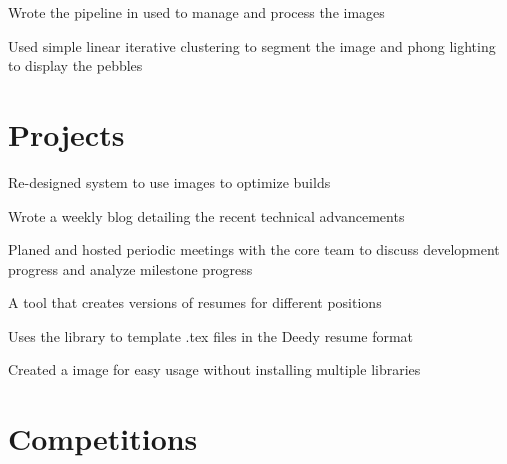 \documentclass[]{deedy-resume-openfont}
\begin{document}
\begin{minipage}[t]{0.66\textwidth}
\begin{tightemize}
\item Wrote the pipeline in used to manage and process the images

\item Used simple linear iterative clustering to segment the image and phong lighting to display the pebbles

\end{tightemize}
\sectionsep

\section{Projects}

\begin{tightemize}

\item Re-designed system to use images to optimize builds

\item Wrote a weekly blog detailing the recent technical advancements

\item Planed and hosted periodic meetings with the core team to discuss development progress and analyze milestone progress

\end{tightemize}
\sectionsep
{}
\begin{tightemize}

\item A tool that creates versions of resumes for different positions

\item Uses the library to template .tex files in the Deedy resume format

\item Created a image for easy usage without installing multiple libraries

\end{tightemize}
\sectionsep

\section{Competitions}

\begin{tabular}{rll}


\end{tabular}
\end{minipage}
\end{document}
